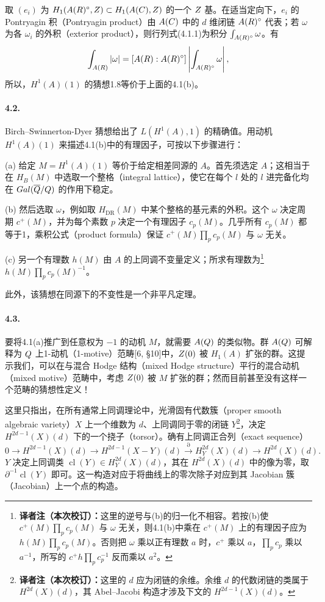 取 $(e_i)$ 为 $H_1(A(R)^\circ,Z)\subset H_1(A(C),Z)$ 的一个 $Z$ 基。在适当定向下，$e_i$ 的 Pontryagin 积（Pontryagin product）由 $A(C)$ 中的 $d$ 维闭链 $A(R)^\circ$ 代表；若 $\omega$ 为各 $\omega_i$ 的外积（exterior product），则行列式(4.1.1)为积分 $\int_{A(R)^\circ}\omega$。有
\[
 \int_{A(R)}|\omega|
 =[A(R):A(R)^\circ]\left|\int_{A(R)^\circ}\omega\right|,
\]
所以，$H^1(A)(1)$ 的猜想1.8等价于上面的4.1(b)。

\paragraph*{4.2.}
Birch--Swinnerton-Dyer 猜想给出了 $L(H^1(A),1)$ 的精确值。用动机 $H^1(A)(1)$ 来描述4.1(b)中的有理因子，可按以下步骤进行：

(a) 给定 $M=H^1(A)(1)$ 等价于给定相差同源的 $A$。首先须选定 $A$；这相当于在 $H_B(M)$ 中选取一个整格（integral lattice），使它在每个 $l$ 处的 $l$ 进完备化均在 $Gal(\overline{Q}/Q)$ 的作用下稳定。

(b) 然后选取 $\omega$，例如取 $H_{\mathrm{DR}}(M)$ 中某个整格的基元素的外积。这个 $\omega$ 决定周期 $c^+(M)$，并为每个素数 $p$ 决定一个有理因子 $c_p(M)$。几乎所有 $c_p(M)$ 都等于1，乘积公式（product formula）保证 $c^+(M)\prod_pc_p(M)$ 与 $\omega$ 无关。

(c) 另一个有理数 $h(M)$ 由 $A$ 的上同调不变量定义；所求有理数为\footnote{\textbf{译者注（本次校订）：}这里的逆号与(b)的归一化不相容。若按(b)使 $c^+(M)\prod_pc_p(M)$ 与 $\omega$ 无关，则4.1(b)中乘在 $c^+(M)$ 上的有理因子应为 $h(M)\prod_pc_p(M)$。否则把 $\omega$ 乘以正有理数 $a$ 时，$c^+$ 乘以 $a$，$\prod_pc_p$ 乘以 $a^{-1}$，所写的 $c^+h\prod_pc_p^{-1}$ 反而乘以 $a^2$。} $h(M)\prod_pc_p(M)^{-1}$。

此外，该猜想在同源下的不变性是一个非平凡定理。

\paragraph*{4.3.}
要将4.1(a)推广到任意权为 $-1$ 的动机 $M$，就需要 $A(Q)$ 的类似物。群 $A(Q)$ 可解释为 $Q$ 上1-动机（1-motive）范畴[6, §10]中，$Z(0)$ 被 $H_1(A)$ 扩张的群。这提示我们，可以在与混合 Hodge 结构（mixed Hodge structure）平行的混合动机（mixed motive）范畴中，考虑 $Z(0)$ 被 $M$ 扩张的群；然而目前甚至没有这样一个范畴的猜想性定义！

这里只指出，在所有通常上同调理论中，光滑固有代数簇（proper smooth algebraic variety）$X$ 上一个维数为 $d$、上同调同于零的闭链 $Y$\footnote{\textbf{译者注（本次校订）：}这里的 $d$ 应为闭链的余维。余维 $d$ 的代数闭链的类属于 $H^{2d}(X)(d)$，其 Abel--Jacobi 构造才涉及下文的 $H^{2d-1}(X)(d)$。}，决定 $H^{2d-1}(X)(d)$ 下的一个挠子（torsor）。确有上同调正合列（exact sequence）
\[
 0\longrightarrow H^{2d-1}(X)(d)
 \longrightarrow H^{2d-1}(X-Y)(d)
 \xrightarrow{\partial} H_Y^{2d}(X)(d)
 \longrightarrow H^{2d}(X)(d).
\]
$Y$ 决定上同调类 $\operatorname{cl}(Y)\in H_Y^{2d}(X)(d)$，其在 $H^{2d}(X)(d)$ 中的像为零，取 $\partial^{-1}\operatorname{cl}(Y)$ 即可。这一构造对应于将曲线上的零次除子对应到其 Jacobian 簇（Jacobian）上一个点的构造。

